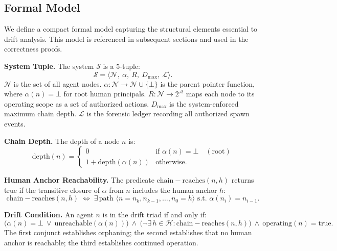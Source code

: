\subsection{Formal Model}
\label{sec:rs-drift-model}

We define a compact formal model capturing the structural elements essential to drift analysis. This model is referenced in subsequent sections and used in the correctness proofs.

\medskip
\noindent\textbf{System Tuple.}
The system $\mathcal{S}$ is a 5-tuple:
\begin{equation}
\mathcal{S} = \langle \mathcal{N},\ \alpha,\ R,\ D_{\max},\ \mathcal{L} \rangle.
\label{eq:rs-system-model}
\end{equation}
$\mathcal{N}$ is the set of all agent nodes. $\alpha: \mathcal{N} \rightarrow \mathcal{N} \cup \{\bot\}$ is the parent pointer function, where $\alpha(n) = \bot$ for root human principals. $R: \mathcal{N} \rightarrow 2^{\mathcal{A}}$ maps each node to its operating scope as a set of authorized actions. $D_{\max}$ is the system-enforced maximum chain depth. $\mathcal{L}$ is the forensic ledger recording all authorized spawn events.

\medskip
\noindent\textbf{Chain Depth.}
The depth of a node $n$ is:
\begin{equation}
\mathrm{depth}(n) =
\begin{cases}
0 & \text{if } \alpha(n) = \bot \quad (\text{root}) \\
1 + \mathrm{depth}(\alpha(n)) & \text{otherwise}.
\end{cases}
\label{eq:rs-depth}
\end{equation}

\medskip
\noindent\textbf{Human Anchor Reachability.}
The predicate $\mathrm{chain-reaches}(n, h)$ returns true if the transitive closure of $\alpha$ from $n$ includes the human anchor $h$:
\begin{equation}
\mathrm{chain-reaches}(n, h) \;\Longleftrightarrow\; \exists\, \text{path } \langle n = n_k, n_{k-1}, \ldots, n_0 = h \rangle \text{ s.t. } \alpha(n_i) = n_{i-1}.
\label{eq:rs-chain-reaches}
\end{equation}

\medskip
\noindent\textbf{Drift Condition.}
An agent $n$ is in the drift triad if and only if:
\begin{equation}
\bigl( \alpha(n) = \bot \ \lor\ \mathrm{unreachable}(\alpha(n)) \bigr)\ \land\ \bigl( \neg\exists\, h \in \mathcal{H} : \mathrm{chain-reaches}(n, h) \bigr)\ \land\ \mathrm{operating}(n) = \mathrm{true}.
\label{eq:rs-drift-condition}
\end{equation}
The first conjunct establishes orphaning; the second establishes that no human anchor is reachable; the third establishes continued operation.

